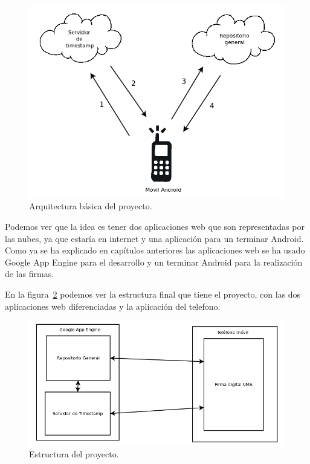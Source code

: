 \begin{figure}
  \centering
    \includegraphics[scale=0.3]{./DisenhoYArquitectura/imagenes/arquitecturaBasica.png}
  \caption{Arquitectura básica del proyecto.}
  \label{fig:arquitecturaBasica}
\end{figure}

Podemos ver que la idea es tener dos aplicaciones web que son representadas por las nubes, ya que estaría en internet y una aplicación para un terminar Android. Como ya se ha explicado en capítulos anteriores las aplicaciones web se ha usado Google App Engine para el desarrollo y un terminar Android para la realización de las firmas. 

En la figura~\ref{fig:estructura} podemos ver la estructura final que tiene el proyecto, con las dos aplicaciones web diferenciadas y la aplicación del telefono.

\begin{figure}
  \centering
    \includegraphics[scale=0.3]{./DisenhoYArquitectura/imagenes/estructura.png}
  \caption{Estructura del proyecto.}
  \label{fig:estructura}
\end{figure}

